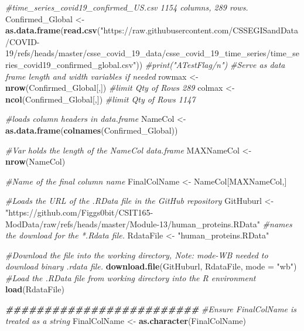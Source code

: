 \documentclass[
]{article}
\newenvironment{Shaded}{\begin{snugshade}}{\end{snugshade}}
\newcommand{\AttributeTok}[1]{\textcolor[rgb]{0.13,0.29,0.53}{#1}}
\newcommand{\CommentTok}[1]{\textcolor[rgb]{0.56,0.35,0.01}{\textit{#1}}}
\newcommand{\DocumentationTok}[1]{\textcolor[rgb]{0.56,0.35,0.01}{\textbf{\textit{#1}}}}
\newcommand{\FunctionTok}[1]{\textcolor[rgb]{0.13,0.29,0.53}{\textbf{#1}}}
\newcommand{\NormalTok}[1]{#1}
\newcommand{\OtherTok}[1]{\textcolor[rgb]{0.56,0.35,0.01}{#1}}
\newcommand{\StringTok}[1]{\textcolor[rgb]{0.31,0.60,0.02}{#1}}
\begin{document}
\begin{Shaded}
\begin{Highlighting}[]
\CommentTok{\#time\_series\_covid19\_confirmed\_US.csv 1154 columns, 289 rows.}
\NormalTok{Confirmed\_Global }\OtherTok{\textless{}{-}} \FunctionTok{as.data.frame}\NormalTok{(}\FunctionTok{read.csv}\NormalTok{(}\StringTok{"https://raw.githubusercontent.com/CSSEGISandData/COVID{-}19/refs/heads/master/csse\_covid\_19\_data/csse\_covid\_19\_time\_series/time\_series\_covid19\_confirmed\_global.csv"}\NormalTok{))}
\CommentTok{\#print("ATestFlag/n")}
\CommentTok{\#Serve as data frame length and width variables if needed}
\NormalTok{rowmax }\OtherTok{\textless{}{-}} \FunctionTok{nrow}\NormalTok{(Confirmed\_Global[,]) }\CommentTok{\#limit Qty of Rows 289}
\NormalTok{colmax }\OtherTok{\textless{}{-}} \FunctionTok{ncol}\NormalTok{(Confirmed\_Global[,]) }\CommentTok{\#limit Qty of Rows 1147}




\CommentTok{\#loads column headers in data.frame}
\NormalTok{NameCol }\OtherTok{\textless{}{-}} \FunctionTok{as.data.frame}\NormalTok{(}\FunctionTok{colnames}\NormalTok{(Confirmed\_Global))}

\CommentTok{\#Var holds the length of the NameCol data.frame}
\NormalTok{MAXNameCol }\OtherTok{\textless{}{-}} \FunctionTok{nrow}\NormalTok{(NameCol)}

\CommentTok{\#Name of the final column name}
\NormalTok{FinalColName }\OtherTok{\textless{}{-}}\NormalTok{ NameCol[MAXNameCol,] }


\CommentTok{\#Loads the URL of the .RData file in the GitHub repository}
\NormalTok{GitHuburl }\OtherTok{\textless{}{-}} \StringTok{"https://github.com/Figgs0bit/CSIT165{-}ModData/raw/refs/heads/master/Module{-}13/human\_proteins.RData"}
\CommentTok{\#names the download for the *.Rdata file.}
\NormalTok{RdataFile }\OtherTok{\textless{}{-}} \StringTok{"human\_proteins.RData"}

\CommentTok{\#Download the file into the working directory, Note: mode{-}WB needed to download binary .rdata file.}
\FunctionTok{download.file}\NormalTok{(GitHuburl, RdataFile, }\AttributeTok{mode =} \StringTok{"wb"}\NormalTok{)}
\CommentTok{\#Load the .RData file from working directory into the R environment}
\FunctionTok{load}\NormalTok{(RdataFile)}



\DocumentationTok{\#\#\#\#\#\#\#\#\#\#\#\#\#\#\#\#\#\#\#\#\#\#\#\#\#}
\CommentTok{\#Ensure FinalColName is treated as a string}
\NormalTok{FinalColName }\OtherTok{\textless{}{-}} \FunctionTok{as.character}\NormalTok{(FinalColName)}


\end{Highlighting}
\end{Shaded}
\end{document}
